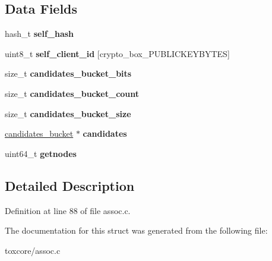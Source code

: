 \subsection*{Data Fields}
\begin{DoxyCompactItemize}
\item 
\hypertarget{struct_assoc_a6531d0c8e69576ae8c58a02914abaefe}{hash\+\_\+t {\bfseries self\+\_\+hash}}\label{struct_assoc_a6531d0c8e69576ae8c58a02914abaefe}

\item 
\hypertarget{struct_assoc_a59ef97a1dbf10c89fb43f6fff2e65b39}{uint8\+\_\+t {\bfseries self\+\_\+client\+\_\+id} \mbox{[}crypto\+\_\+box\+\_\+\+P\+U\+B\+L\+I\+C\+K\+E\+Y\+B\+Y\+T\+E\+S\mbox{]}}\label{struct_assoc_a59ef97a1dbf10c89fb43f6fff2e65b39}

\item 
\hypertarget{struct_assoc_ab4153986e9b7dd71547967436299a424}{size\+\_\+t {\bfseries candidates\+\_\+bucket\+\_\+bits}}\label{struct_assoc_ab4153986e9b7dd71547967436299a424}

\item 
\hypertarget{struct_assoc_a22dd0674eae131fab27462b931d4397c}{size\+\_\+t {\bfseries candidates\+\_\+bucket\+\_\+count}}\label{struct_assoc_a22dd0674eae131fab27462b931d4397c}

\item 
\hypertarget{struct_assoc_a9349f5b3095733f74b3704aa9766a05a}{size\+\_\+t {\bfseries candidates\+\_\+bucket\+\_\+size}}\label{struct_assoc_a9349f5b3095733f74b3704aa9766a05a}

\item 
\hypertarget{struct_assoc_a9d492ea4282a0aca2bcb32d987f58175}{\hyperlink{structcandidates__bucket}{candidates\+\_\+bucket} $\ast$ {\bfseries candidates}}\label{struct_assoc_a9d492ea4282a0aca2bcb32d987f58175}

\item 
\hypertarget{struct_assoc_aec732782691c39a31d8c579a79a8fed2}{uint64\+\_\+t {\bfseries getnodes}}\label{struct_assoc_aec732782691c39a31d8c579a79a8fed2}

\end{DoxyCompactItemize}


\subsection{Detailed Description}


Definition at line 88 of file assoc.\+c.



The documentation for this struct was generated from the following file\+:\begin{DoxyCompactItemize}
\item 
toxcore/assoc.\+c\end{DoxyCompactItemize}
